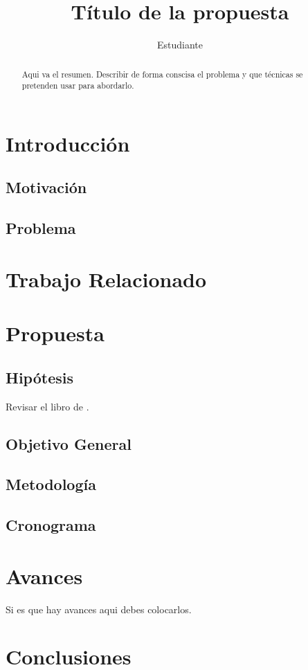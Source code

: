 \documentclass[]{article}
\title{Título de la propuesta}
\author{Estudiante}
\begin{document}
	

	
	

\begin{abstract}
	Aqui va el resumen. Describir de forma conscisa el problema y que técnicas se pretenden usar para abordarlo. 
\end{abstract}



\section{Introducción}
\subsection{Motivación}
\subsection{Problema}

\section{Trabajo Relacionado}

\section{Propuesta}

\subsection{Hipótesis}

Revisar el libro de \cite{hernandez2018metodologia}.

\subsection{Objetivo General}
\subsection{Metodología}

\subsection{Cronograma}

\section{Avances}

Si es que hay avances aqui debes colocarlos.

\section{Conclusiones}



\end{document}
